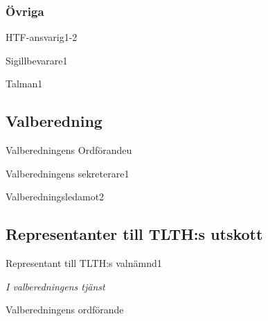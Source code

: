 \documentclass[10pt]{article}
\begin{document}
\subsubsection{Övriga}
\begin{vallista}
    \begin{post}{HTF-ansvarig}{1-2}
    \end{post}
    \begin{post}{Sigillbevarare}{1}

    \end{post}
    \begin{post}{Talman}{1}
    \end{post}
\end{vallista}

\subsection{Valberedning}
\begin{vallista}
    \begin{post}{Valberedningens Ordförande}{u}
    \end{post}
    \begin{post}{Valberedningens sekreterare}{1}
    \end{post}
    \begin{post}{Valberedningsledamot}{2}
    \end{post}
\end{vallista}

\subsection{Representanter till TLTH:s utskott}
\begin{vallista}
    \begin{post}{Representant till TLTH:s valnämnd}{1}
        \vakant
    \end{post}
\end{vallista}

\begin{signatures}{1}
\emph{I valberedningens tjänst}
\signature{Christian Benson}{Valberedningens ordförande}
\end{signatures}
\end{document}

